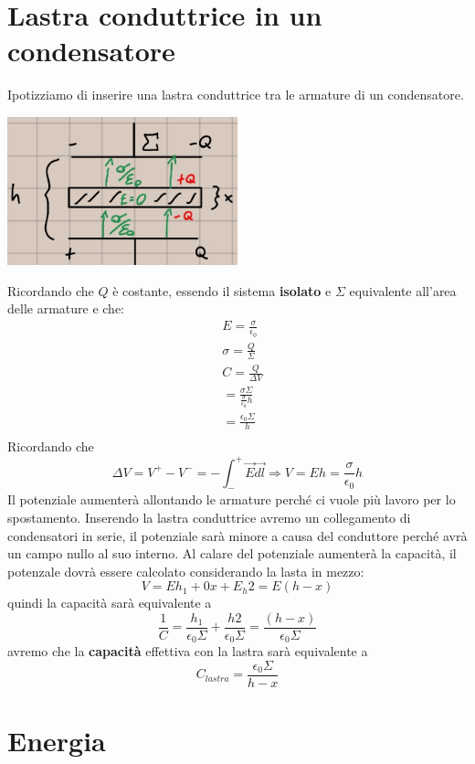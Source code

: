 \documentclass[a4paper, 12pt]{book}
\theoremstyle{plain}
\begin{document}
\section{Lastra conduttrice in un condensatore}

Ipotizziamo di inserire una lastra conduttrice tra le 
armature di un condensatore.
\begin{center}
    \includegraphics[width=0.5\textwidth]{lastra.jpg}
\end{center}
Ricordando che $Q$ è costante, essendo il sistema \textbf{isolato}
e $\Sigma$ equivalente all'area delle armature e che:
\[
    \begin{split}
        &E = \frac{\sigma}{\epsilon_0} \\
        &\sigma = \frac{Q}{\Sigma} \\
        &C = \frac{Q}{\Delta V} \\
        &= \frac{\sigma \Sigma}{\frac{\sigma}{\epsilon_0} h} \\
        &= \frac{\epsilon_0 \Sigma}{h} \\
    \end{split}
\]
Ricordando che \[ \Delta V = V^+ - V^- = - \int_-^+ \vec{E} \vec{dl} \Rightarrow V = Eh = \frac{\sigma}{\epsilon_0}h \] 
Il potenziale aumenterà allontando le armature perché ci vuole più 
lavoro per lo spostamento. Inserendo la lastra conduttrice
avremo un collegamento di condensatori in serie, il potenziale 
sarà minore a causa del conduttore perché avrà un campo nullo al suo interno.
Al calare del potenziale aumenterà la capacità, il potenzale
dovrà essere calcolato considerando la lasta in mezzo:
\[ V = Eh_1 + 0x + E_h2 = E(h - x) \] quindi la capacità
sarà equivalente a \[ \frac{1}{C} = \frac{h_1}{\epsilon_0 \Sigma}
+ \frac{h2}{\epsilon_0 \Sigma} = \frac{(h - x)}{\epsilon_0 \Sigma} \] 
avremo che la \textbf{capacità} effettiva con la lastra 
sarà equivalente a \[ C_{lastra} = \frac{\epsilon_0 \Sigma}{h - x} \] 

\section{Energia}
\end{document}
